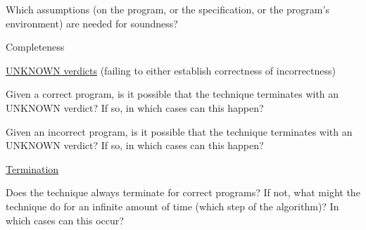 \documentclass[a4paper]{article}
\begin{document}
\begin{minipage}[t]{0.16\linewidth}
\begin{betterlist}
\begin{betterlist}
\begin{betterlist}
			\end{betterlist}
			\item Which assumptions (on the program, or the specification, or the program’s environment) are needed for soundness?
		\end{betterlist}
		\item \alert{Completeness}
		\begin{betterlist}
			\item \underline{UNKNOWN verdicts} (failing to either establish correctness of incorrectness)
			\begin{betterlist}
				\item Given a correct program, is it possible that the technique terminates with an UNKNOWN verdict? If so, in which cases can this happen?

				\item Given an incorrect program, is it possible that the technique terminates with an UNKNOWN verdict? If so, in which cases can this happen?

			\end{betterlist}
			\item \underline{Termination}
			\begin{betterlist}
				\item Does the technique always terminate for correct programs? If not, what might the technique do for an infinite amount of time (which step of the algorithm)? In which cases can this occur?


\end{betterlist}
\end{betterlist}
\end{betterlist}
\end{minipage}
\end{document}

